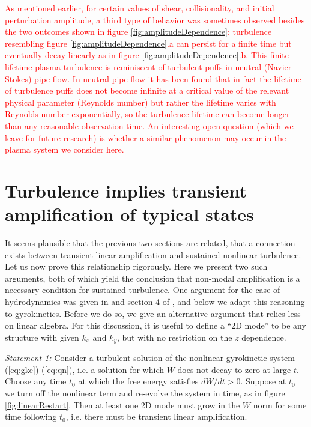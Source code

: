 \documentclass[12pt,superscriptaddress]{revtex4}
\newcommand{\changed}[1]{\textcolor{red}{#1}}
\begin{document}
\changed{
As mentioned earlier, for certain values of shear, collisionality, and initial perturbation amplitude,
a third type of behavior was sometimes observed besides the two outcomes shown in figure \ref{fig:amplitudeDependence}:
turbulence resembling figure  \ref{fig:amplitudeDependence}.a can persist for a finite time but eventually decay linearly
as in figure  \ref{fig:amplitudeDependence}.b.
This finite-lifetime plasma turbulence is reminiscent of turbulent puffs in neutral (Navier-Stokes) pipe flow.
In neutral pipe flow it has been found \cite{Hof2006, Tel} that in fact
the lifetime of turbulence puffs does not become infinite at a critical value of the relevant physical parameter (Reynolds number) but rather
the lifetime varies with Reynolds number exponentially, so the turbulence lifetime can become longer than any reasonable observation
time.
An interesting open question (which we leave for future research) is whether a similar phenomenon may occur
in the plasma system we consider here.
}

\section{Turbulence implies transient amplification of typical states}
\label{sec:proof}

It seems plausible that the previous two sections are related,
that a connection exists between transient linear amplification and sustained nonlinear turbulence.
Let us now prove this relationship rigorously.
Here we present two such arguments,
both of which yield the conclusion that non-modal amplification is a necessary condition
for sustained turbulence.  One argument for the case of hydrodynamics
was given in \cite{DelSoleNecessity} and section 4 of \cite{DelSoleSurvey},
and below we adapt this reasoning to gyrokinetics.  Before we do so, we give an alternative
argument that relies less on linear algebra.
For this discussion, it is useful to define a ``2D mode'' to be any structure with given $k_x$ and $k_y$,
but with no restriction on the $z$ dependence.

{\it Statement 1:} Consider a turbulent solution of the nonlinear gyrokinetic system (\ref{eq:gke})-(\ref{eq:qn}),
i.e. a solution for which $W$ does not decay to zero at large $t$.
Choose any time $t_0$ at which the free energy satisfies $dW/dt>0$.
Suppose at $t_0$ we turn off the nonlinear term
and re-evolve the system in time, as in figure \ref{fig:linearRestart}.
Then at least one 2D mode must grow in the $W$ norm
for some time following $t_0$, i.e. there must be transient linear amplification.
\end{document}
